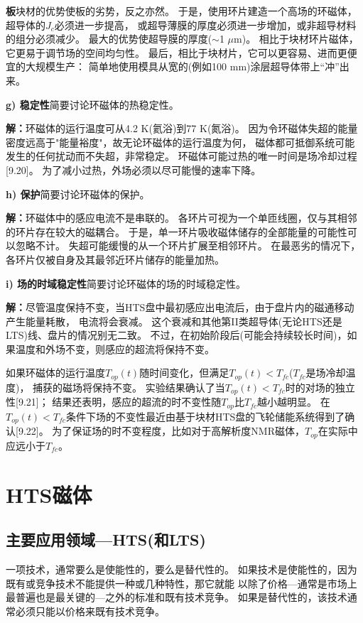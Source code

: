 \textbf{板}\qquad 块材的优势使板的劣势，反之亦然。
于是，使用环片建造一个高场的环磁体，超导体的$J_c$必须进一步提高，
或超导薄膜的厚度必须进一步增加，或非超导材料的组分必须减少。
最大的优势使超导膜的厚度($\sim$1 $\mu$m)。
相比于块材环片磁体，它更易于调节场的空间均匀性。
最后，相比于块材片，它可以更容易、进而更便宜的大规模生产：
简单地使用模具从宽的(例如100 mm)涂层超导体带上“冲”出来。


\textbf{g) 稳定性}\qquad 简要讨论环磁体的热稳定性。

\textbf{解：}环磁体的运行温度可从4.2 K(氦浴)到77 K(氮浴)。
因为令环磁体失超的能量密度远高于"能量裕度"，故无论环磁体的运行温度为何，
磁体都可抵御系统可能发生的任何扰动而不失超，非常稳定。
环磁体可能过热的唯一时间是场冷却过程[9.20]。
为了减小过热，外场必须以尽可能慢的速率下降。

\textbf{h) 保护}\qquad 简要讨论环磁体的保护。

\textbf{解：}环磁体中的感应电流不是串联的。
各环片可视为一个单匝线圈，仅与其相邻的环片存在较大的磁耦合。
于是，单一环片吸收磁体储存的全部能量的可能性可以忽略不计。
失超可能缓慢的从一个环片扩展至相邻环片。
在最恶劣的情况下，各环片仅被自身及其最邻近环片储存的能量加热。

\textbf{i) 场的时域稳定性}\qquad 简要讨论环磁体的场的时域稳定性。

\textbf{解：}尽管温度保持不变，当HTS盘中最初感应出电流后，由于盘片内的磁通移动产生能量耗散，
电流将会衰减。
这个衰减和其他第II类超导体(无论HTS还是LTS)线、盘片的情况别无二致。
不过，在初始阶段后(可能会持续较长时间)，如果温度和外场不变，则感应的超流将保持不变。

如果环磁体的运行温度$T_{op}(t)$随时间变化，但满足$T_{op}(t)<T_{fc}$($T_{fc}$是场冷却温度)，
捕获的磁场将保持不变。
实验结果确认了当$T_{op}(t)<T_{fc}$时的对场的独立性[9.21]；
结果还表明，感应的超流的时不变性随$T_{op}$比$T_{fc}$越小越明显。
在$T_{op}(t)<T_{fc}$条件下场的不变性最近由基于块材HTS盘的飞轮储能系统得到了确认[9.22]。
为了保证场的时不变程度，比如对于高解析度NMR磁体，$T_{op}$在实际中应远小于$T_{fc}$。

\section{HTS磁体}
\subsection{主要应用领域---HTS(和LTS)}
一项技术，通常要么是使能性的，要么是替代性的。
如果技术是使能性的，因为既有或竞争技术不能提供一种或几种特性，那它就能
以除了价格---通常是市场上最普遍也是最关键的---之外的标准和既有技术竞争。
如果是替代性的，该技术通常必须只能以价格来既有技术竞争。

